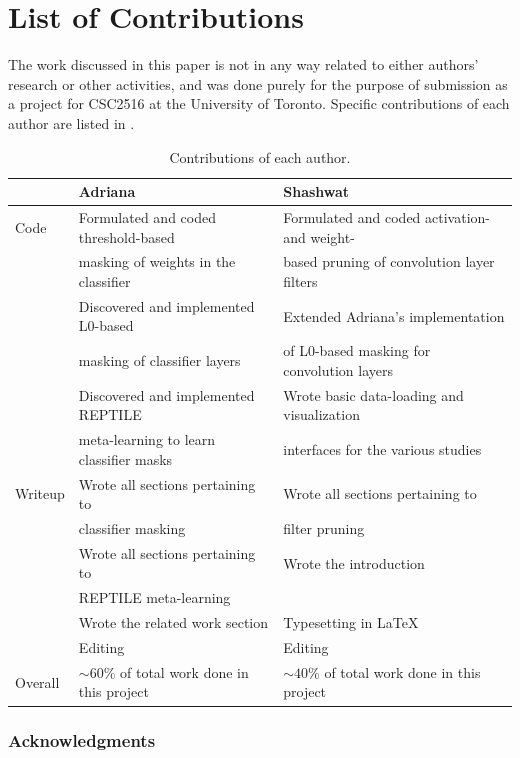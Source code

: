 \documentclass{article}
\begin{document}
\section{List of Contributions}

The work discussed in this paper is not in any way related to either authors' research or other activities, and was done purely for the purpose of submission as a project for CSC2516 at the University of Toronto. Specific contributions of each author are listed in .

\begin{table}[!h]
	\centering
	\caption{Contributions of each author.}
	\begin{tabular}{lll}
		\toprule
		& Adriana & Shashwat \\
		\midrule
		Code & Formulated and coded threshold-based & Formulated  and coded activation- and weight- \\
		& masking of weights in the classifier & based pruning of convolution layer filters \\[2mm]
		& Discovered and implemented L0-based & Extended Adriana's implementation \\
		& masking of classifier layers & of L0-based masking for convolution layers \\[2mm]
		& Discovered and implemented REPTILE & Wrote basic data-loading and visualization \\
		& meta-learning to learn classifier masks & interfaces for the various studies \\[2mm]
		Writeup & Wrote all sections pertaining to & Wrote all sections pertaining to \\
		& classifier masking & filter pruning\\[2mm]
		& Wrote all sections pertaining to & Wrote the introduction \\
		& REPTILE meta-learning & \\[2mm]
		& Wrote the related work section & Typesetting in \LaTeX \\[2mm]
		& Editing & Editing \\[2mm]
		Overall & $\sim 60$\% of total work done in this project & $\sim 40$\% of total work done in this project \\
		\bottomrule
	\end{tabular}
	\label{contr}
\end{table}

\subsubsection*{Acknowledgments}
\end{document}

